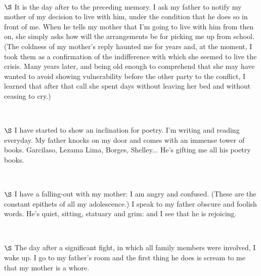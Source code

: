 \documentclass[a4paper, 12pt]{article}
\begin{document}
~ 

$\S$ It is the day after to the preceding memory. I ask my father to notify my
mother of my decision to live with him, under the condition that he does so in
front of me. When he tells my mother that I'm going to live with him from then
on, she simply asks how will the arrangements be for picking me up from school.
(The coldness of my mother's reply haunted me for years and, at the moment, I
took them as a confirmation of the indifference with which she seemed to live
the crisis. Many years later, and being old enough to comprehend that she may
have wanted to avoid showing vulnerability before the other party to the
conflict, I learned that after that call she spent days without leaving her bed
and without ceasing to cry.)

~ 

$\S$ I have started to show an inclination for poetry. I'm writing and reading
everyday. My father knocks on my door and comes with an immense tower of books.
Garcilaso, Lezama Lima, Borges, Shelley... He's gifting me all his poetry
books.

~ 

$\S$ I have a falling-out with my mother: I am angry and confused. (These are
the constant epithets of all my adolescence.) I speak to my father obscure and
foolish words. He's quiet, sitting, statuary and grim: and I see that he is
rejoicing.

~ 

$\S$ The day after a significant fight, in which all family members were
involved, I wake up. I go to my father's room and the first thing he does is
scream to me that my mother is a whore.
\end{document}

